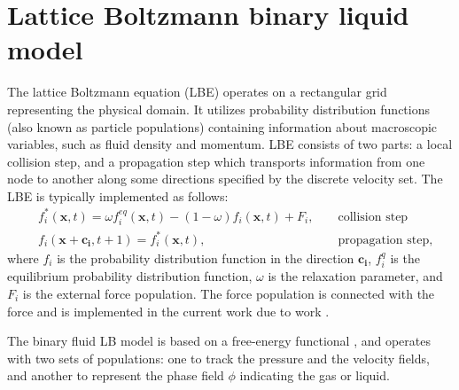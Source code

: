 \documentclass[preprint,12pt]{elsarticle}
\begin{document}
\section{Lattice Boltzmann binary liquid model}
The lattice Boltzmann equation (LBE) operates on a rectangular grid representing the
physical domain. It utilizes
probability distribution functions (also known as particle populations)
containing information about
macroscopic variables, such as fluid density and momentum. LBE consists of
two parts: a local collision step, and a propagation step which transports
information from one node to another along some 
directions specified by the discrete velocity set.
The LBE is typically implemented as follows:
\begin{equation}
\label{standard:implementation}
\begin{aligned}
&f_i^{*}(\bm{x},t)=\omega f_i^{eq}(\bm{x},t)-(1-\omega) f_i(\bm{x},t) +
F_i,&&\text{ collision step}\\
&f_i(\bm{x}+\bm{c_i},t+1)=f_i^{*}(\bm{x},t),&&\text{ propagation step}, 
\end{aligned}
\end{equation}
where $f_i$ is the probability distribution function in the direction $\bm{c_i}$,
{\color{red} $f_i^{q}$ is the equilibrium probability distribution function}, $\omega$ is the
relaxation parameter, and $F_i$ is the external force population.{\color{red} The force population
is connected with the force and is implemented in the current work due to work \cite{guo}.} 

The binary fluid LB model is
based on a free-energy functional \cite{swift,landau}, and operates with two
sets of populations: one to track the pressure and the velocity fields, and another to represent the
phase field $\phi$ indicating the gas or liquid.
\end{document}
